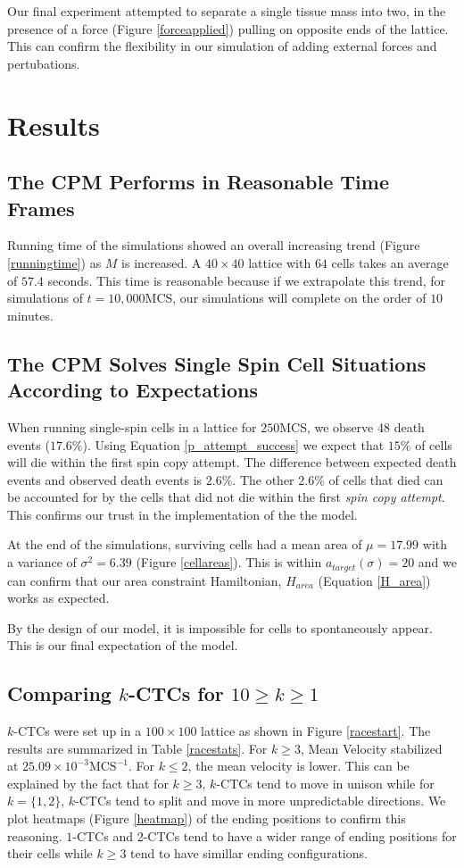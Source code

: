 \documentclass[12pt]{article}
\begin{document}
Our final experiment attempted to separate a single tissue mass into two, in the presence of a force (Figure \ref{forceapplied}) pulling on opposite ends of the lattice. This can confirm the flexibility in our simulation of adding external forces and pertubations.

\section{Results}
\subsection{The CPM Performs in Reasonable Time Frames}
Running time of the simulations showed an overall increasing trend (Figure \ref{runningtime}) as $M$ is increased. A $40\times40$ lattice with $64$ cells takes an average of $57.4$ seconds. This time is reasonable because if we extrapolate this trend, for simulations of $t=10,000$MCS, our simulations will complete on the order of $10$ minutes.

\subsection{The CPM Solves Single Spin Cell Situations According to Expectations}
When running single-spin cells in a lattice for $250$MCS, we observe 48 death events ($17.6\%$). Using Equation \ref{p_attempt_success} we expect that $15\%$ of cells will die within the first spin copy attempt. The difference between expected death events and observed death events is $2.6\%$. The other $2.6\%$ of cells that died can be accounted for by the cells that did not die within the first \emph{spin copy attempt}. This confirms our trust in the implementation of the the model.

At the end of the simulations, surviving cells had a mean area of $\mu = 17.99$ with a variance of $\sigma^2 = 6.39$ (Figure \ref{cellareas}). This is within $a_{target}(\sigma)=20$ and we can confirm that our area constraint Hamiltonian, $H_{area}$ (Equation \ref{H_area}) works as expected. 

By the design of our model, it is impossible for cells to spontaneously appear. This is our final expectation of the model.

\subsection{Comparing $k$-CTCs for $10 \geq k\geq1$} %
$k$-CTCs were set up in a $100\times100$ lattice as shown in Figure \ref{racestart}. The results are summarized in Table \ref{racestats}. For $k\geq3$, Mean Velocity stabilized at $25.09\times10^{-3}\text{MCS}^{-1}$. For $k\leq2$, the mean velocity is lower. This can be explained by the fact that for $k\geq3$, $k$-CTCs tend to move in unison while for $k=\{1,2\}$, $k$-CTCs tend to split and move in more unpredictable directions. We plot heatmaps (Figure \ref{heatmap}) of the ending positions to confirm this reasoning. $1$-CTCs and $2$-CTCs tend to have a wider range of ending positions for their cells while $k\geq3$ tend to have simillar ending configurations.
\end{document}
